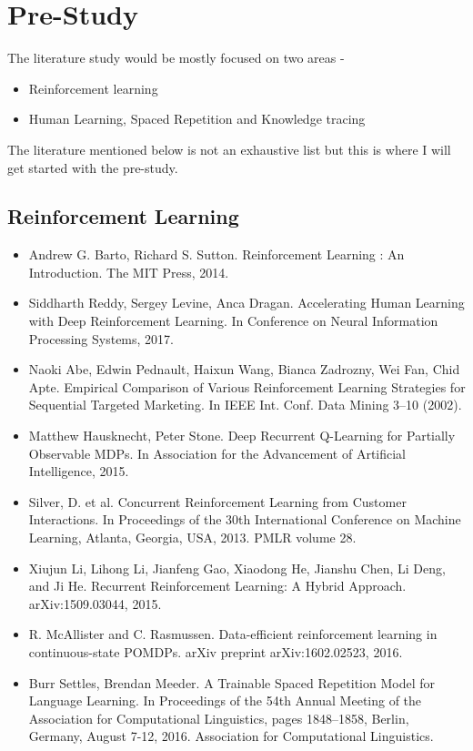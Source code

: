 \documentclass[12pt]{article}
\begin{document}
\section{Pre-Study}
The literature study would be mostly focused on two areas -
\begin{itemize}
    \item Reinforcement learning
    \item Human Learning, Spaced Repetition and Knowledge tracing
\end{itemize} 
The literature mentioned below is not an exhaustive list but this is where I will get started with the pre-study.

\subsection{Reinforcement Learning}
\begin{itemize}
    \item Andrew G. Barto, Richard S. Sutton. Reinforcement Learning : An Introduction. The MIT Press, 2014.
    \item Siddharth Reddy, Sergey Levine, Anca Dragan. Accelerating Human Learning with Deep Reinforcement Learning. In Conference on Neural Information Processing Systems, 2017.
    \item Naoki Abe, Edwin Pednault, Haixun Wang, Bianca Zadrozny, Wei Fan, Chid Apte. Empirical Comparison of Various Reinforcement Learning Strategies for Sequential Targeted Marketing. In IEEE Int. Conf. Data Mining 3–10 (2002).
    \item Matthew Hausknecht, Peter Stone. Deep Recurrent Q-Learning for Partially Observable MDPs. In Association for the Advancement of Artificial Intelligence, 2015.
    \item Silver, D. et al. Concurrent Reinforcement Learning from Customer Interactions. In Proceedings of the 30th International Conference on Machine Learning, Atlanta, Georgia, USA, 2013. PMLR volume 28.
    \item Xiujun Li, Lihong Li, Jianfeng Gao, Xiaodong He, Jianshu Chen, Li Deng, and Ji He. Recurrent Reinforcement Learning: A Hybrid Approach. arXiv:1509.03044, 2015.
    \item R. McAllister and C. Rasmussen. Data-efficient reinforcement learning in continuous-state POMDPs. arXiv preprint arXiv:1602.02523, 2016.
    \item Burr Settles, Brendan Meeder. A Trainable Spaced Repetition Model for Language Learning. In Proceedings of the 54th Annual Meeting of the Association for Computational Linguistics, pages 1848–1858, Berlin, Germany, August 7-12, 2016. Association for Computational Linguistics.
\end{itemize}
\end{document}
